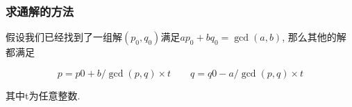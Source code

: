 \subsubsection{求通解的方法}

假设我们已经找到了一组解$(p_0, q_0)$满足$a p_0 + b q_0 = \gcd(a,b)$, 那么其他的解都满足

$$p = p0 + b/\gcd(p, q) \times t\quad\quad q = q0 - a / \gcd(p, q) \times t$$

其中t为任意整数.